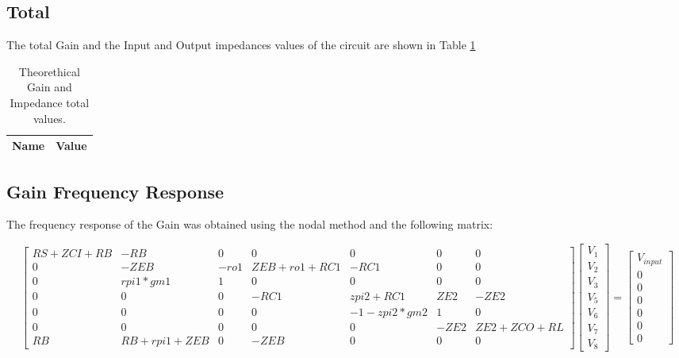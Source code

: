 \subsection{Total}

The total Gain and the Input and Output impedances values of the circuit are shown in Table \ref{tab:teo_total}

\begin{table}[H]
	\centering
	\begin{tabular}{|l|r|}
		\hline    
		{\bf Name} & {\bf Value} \\ \hline
		
	\end{tabular}
	\caption{Theorethical Gain and Impedance total values.}
	\label{tab:teo_total}
\end{table}

\subsection{Gain Frequency Response}

The frequency response of the Gain was obtained using the nodal method and the following matrix:

\begin{equation}
\begin{bmatrix}
RS+ZCI+RB & -RB& 0& 0& 0& 0& 0 \\ 
0 & -ZEB & -ro1 & ZEB+ro1+RC1 & -RC1&  0& 0\\ 
0 & rpi1*gm1 & 1 & 0 & 0 &  0& 0\\ 
0 & 0 & 0 & -RC1 & zpi2+RC1 & ZE2 & -ZE2 \\ 
0 & 0 &0  & 0 & -1-zpi2*gm2  & 1 & 0 \\
0 & 0 &0  & 0 & 0 & -ZE2 & ZE2+ZCO+RL\\ 
RB & RB+rpi1+ZEB & 0 & -ZEB & 0 & 0 & 0
\end{bmatrix}
\begin{bmatrix}
V_{1}\\ 
V_{2}\\ 
V_{3}\\ 
V_{5}\\ 
V_{6}\\ 
V_{7}\\ 
V_{8}
\end{bmatrix}
=
\begin{bmatrix}
V_{input}\\ 
0\\ 
0\\ 
0\\ 
0\\ 
0\\ 
0
\end{bmatrix}
\end{equation}


